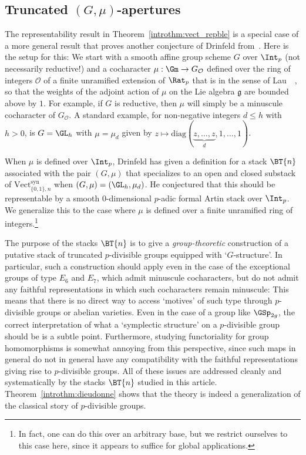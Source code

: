 \documentclass[10pt]{amsart}
\begin{document}
\subsection{Truncated $(G,\mu)$-apertures}
\label{subsec:trunc_Gmu}
The representability result in Theorem~\ref{introthm:vect_repble} is a special case of a more general result that proves another conjecture of Drinfeld from~\cite{drinfeld2023shimurian}. Here is the setup for this: We start with a smooth affine group scheme $G$ over $\Int_p$ (not necessarily reductive!) and a cocharacter $\mu:\Gm\to G_{\mathcal{O}}$ defined over the ring of integers $\mathcal{O}$ of a finite unramified extension of $\Rat_p$ that is  in the sense of Lau~~\cite{MR4355476}, so that the weights of the adjoint action of $\mu$ on the Lie algebra $\mathfrak{g}$ are bounded above by $1$. For example, if $G$ is reductive, then $\mu$ will simply be a minuscule cocharacter of $G_{\mathcal{O}}$. A standard example, for non-negative integers $d\leq h$ with $h>0$, is $G = \GL_h$ with $\mu = \mu_d$ given by $z\mapsto \mathrm{diag}(\underbrace{z,\ldots,z}_{d},1,\ldots,1)$. 

When $\mu$ is defined over $\Int_p$, Drinfeld has given a definition for a stack $\BT{n}$ associated with the pair $(G,\mu)$ that specializes to an open and closed substack of $\mathrm{Vect}^{\mathrm{syn}}_{\{0,1\},n}$ when $(G,\mu) = (\GL_h,\mu_d)$. He conjectured that this should be representable by a smooth $0$-dimensional $p$-adic formal Artin stack over $\Int_p$. We generalize this to the case where $\mu$ is defined over a finite unramified ring of integers.\footnote{In fact, one can do this over an arbitrary base, but we restrict ourselves to this case here, since it appears to suffice for global applications.}

\begin{introrem}
The purpose of the stacks $\BT{n}$ is to give a \emph{group-theoretic} construction of a putative stack of truncated $p$-divisible groups equipped with `$G$-structure'. In particular, such a construction should apply even in the case of the exceptional groups of type $E_6$ and $E_7$, which admit minuscule cocharacters, but do not admit any faithful representations in which such cocharacters remain minuscule: This means that there is no direct way to access `motives' of such type through $p$-divisible groups or abelian varieties. Even in the case of a group like $\GSp_{2g}$, the correct interpretation of what a `symplectic structure' on a $p$-divisible group should be is a subtle point. Furthermore, studying functoriality for group homomorphisms is somewhat annoying from this perspective, since such maps in general do not in general have any compatibility with the faithful representations giving rise to $p$-divisible groups. All of these issues are addressed cleanly and systematically by the stacks $\BT{n}$ studied in this article. Theorem~\ref{introthm:dieudonne} shows that the theory is indeed a generalization of the classical story of $p$-divisible groups.
\end{introrem}
\end{document}
